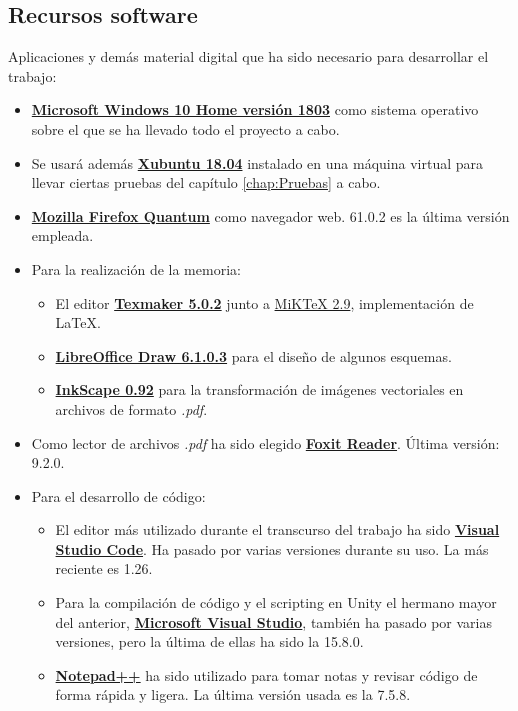 \subsection{Recursos software}
Aplicaciones y demás material digital que ha sido necesario para desarrollar el trabajo:
\begin{itemize}
\item \href{https://www.microsoft.com/es-es/windows}{\textbf{Microsoft Windows 10 Home versión 1803}} como sistema operativo sobre el que se ha llevado todo el proyecto a cabo.
\item Se usará además \href{https://xubuntu.org/about/}{\textbf{Xubuntu 18.04}} instalado en una máquina virtual para llevar ciertas pruebas del capítulo \ref{chap:Pruebas} a cabo.
\item \href{https://www.mozilla.org/es-ES/firefox/}{\textbf{Mozilla Firefox Quantum}} como navegador web. 61.0.2 es la última versión empleada.
\item Para la realización de la memoria:
\begin{itemize}
\item El editor \href{http://www.xm1math.net/texmaker/}{\textbf{Texmaker 5.0.2}} junto a \href{https://miktex.org/about}{MiKTeX 2.9}, implementación de \LaTeX.
\item \href{https://es.libreoffice.org/descubre/draw/}{\textbf{LibreOffice Draw 6.1.0.3}} para el diseño de algunos esquemas.
\item \href{https://inkscape.org/es/}{\textbf{InkScape 0.92}} para la transformación de imágenes vectoriales en archivos de formato \textit{.pdf}.
\end{itemize}
\item Como lector de archivos \textit{.pdf} ha sido elegido \href{https://www.foxitsoftware.com/pdf-reader/}{\textbf{Foxit Reader}}. Última versión: 9.2.0.
\item Para el desarrollo de código:
\begin{itemize}
\item El editor más utilizado durante el transcurso del trabajo ha sido \href{https://code.visualstudio.com/}{\textbf{Visual Studio Code}}. Ha pasado por varias versiones durante su uso. La más reciente es 1.26.
\item Para la compilación de código y el scripting en Unity el hermano mayor del anterior, \href{https://visualstudio.microsoft.com/es/}{\textbf{Microsoft Visual Studio}}, también ha pasado por varias versiones, pero la última de ellas ha sido la 15.8.0.
\item \href{https://notepad-plus-plus.org/}{\textbf{Notepad++}} ha sido utilizado para tomar notas y revisar código de forma rápida y ligera. La última versión usada es la 7.5.8.

\end{itemize}
\end{itemize}
